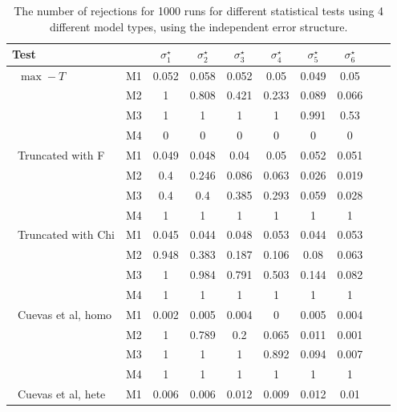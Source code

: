 \documentclass[12pt]{article}
\begin{document}
{\footnotesize
    \begin{table}[H]
    \caption{ The number of rejections for 1000 runs for different statistical
    tests using 4 different model types, using the independent error structure.}
        \centering
        \begin{tabular}{l l c c c c c c c c}
            \hline
            Test                 &    & $\sigma_1^\star$ & $\sigma_2^\star$ & $\sigma_3^\star$
                              & $\sigma_4^\star$ & $\sigma_5^\star$ & $\sigma_6^\star$ \\[0.5ex]
            \hline
            \ $\max-T$              & M1 & 0.052 & 0.058 & 0.052 & 0.05 & 0.049 & 0.05  \\
                                 & M2 & 1  & 0.808 & 0.421 & 0.233 & 0.089 & 0.066  \\
                                 & M3 &   1  & 1 & 1 & 1 & 0.991 & 0.53  \\
                                 & M4 & 0  & 0 & 0 & 0 & 0 & 0 &  \\\hline
            \ Truncated with F   & M1 & 0.049&	0.048	&0.04	&0.05&	0.052&	0.051  \\
                                 & M2 & 0.4	& 0.246 &	0.086&	0.063	&0.026	&0.019    \\
                                 & M3 & 0.4	&0.4&	0.385&	0.293&	0.059&	0.028    \\
                                 & M4 & 1  & 1   & 1   & 1   & 1   & 1   \\\hline
             \ Truncated with Chi   & M1 & 0.045	&0.044&	0.048&	0.053&	0.044&	0.053  \\
                                    & M2 & 0.948&	0.383&	0.187&	0.106&	0.08&	0.063     \\
                                    & M3 & 1	&0.984&	0.791&	0.503&	0.144&	0.082    \\
                                    & M4 & 1  & 1   & 1   & 1   & 1   & 1   \\ \hline
            \ Cuevas et al, homo & M1 & 0.002	&0.005&	0.004&	0&	0.005&	0.004  \\
                                 & M2 & 1&	0.789&	0.2&	0.065&	0.011&	0.001 \\
                                 & M3 &   1	&1&	1&	0.892&	0.094&	0.007 \\
                                 & M4 & 1&	1&	1&	1&	1&	1  \\\hline
            \ Cuevas et al, hete & M1 & 0.006	&0.006&	0.012&	0.009&	0.012&	0.01  \\

\end{tabular}
\end{table}}
\end{document}

